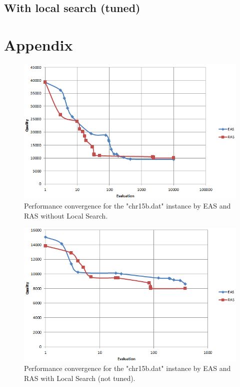 \documentclass[12pt]{article}
\begin{document}
\subsection{With local search (tuned)}


\section{Appendix}

\begin{figure}[H]
  \centering
    \includegraphics[scale=0.9]{no-ls.PNG}
  \caption{Performance convergence for the "chr15b.dat" instance by EAS and RAS without Local Search.}
  \label{fig:convergence-no-ls}
\end{figure}

\begin{figure}[H]
  \centering
    \includegraphics[scale=0.9]{ls-not-tuned.PNG}
  \caption{Performance convergence for the "chr15b.dat" instance by EAS and RAS with Local Search (not tuned).}
  \label{fig:convergence-ls-not-tuned}
\end{figure}
\end{document}
